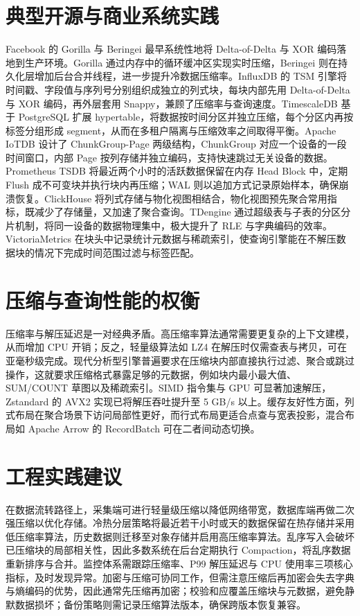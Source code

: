 \chapter{典型开源与商业系统实践}
Facebook 的 Gorilla 与 Beringei 最早系统性地将 Delta-of-Delta 与 XOR 编码落地到生产环境。Gorilla 通过内存中的循环缓冲区实现实时压缩，Beringei 则在持久化层增加后台合并线程，进一步提升冷数据压缩率。InfluxDB 的 TSM 引擎将时间戳、字段值与序列号分别组织成独立的列式块，每块内部先用 Delta-of-Delta 与 XOR 编码，再外层套用 Snappy，兼顾了压缩率与查询速度。TimescaleDB 基于 PostgreSQL 扩展 hypertable，将数据按时间分区并独立压缩，每个分区内再按标签分组形成 segment，从而在多租户隔离与压缩效率之间取得平衡。Apache IoTDB 设计了 ChunkGroup-Page 两级结构，ChunkGroup 对应一个设备的一段时间窗口，内部 Page 按列存储并独立编码，支持快速跳过无关设备的数据。Prometheus TSDB 将最近两个小时的活跃数据保留在内存 Head Block 中，定期 Flush 成不可变块并执行块内再压缩；WAL 则以追加方式记录原始样本，确保崩溃恢复。ClickHouse 将列式存储与物化视图相结合，物化视图预先聚合常用指标，既减少了存储量，又加速了聚合查询。TDengine 通过超级表与子表的分区分片机制，将同一设备的数据物理集中，极大提升了 RLE 与字典编码的效率。VictoriaMetrics 在块头中记录统计元数据与稀疏索引，使查询引擎能在不解压数据块的情况下完成时间范围过滤与标签匹配。\par
\chapter{压缩与查询性能的权衡}
压缩率与解压延迟是一对经典矛盾。高压缩率算法通常需要更复杂的上下文建模，从而增加 CPU 开销；反之，轻量级算法如 LZ4 在解压时仅需查表与拷贝，可在亚毫秒级完成。现代分析型引擎普遍要求在压缩块内部直接执行过滤、聚合或跳过操作，这就要求压缩格式暴露足够的元数据，例如块内最小最大值、SUM/COUNT 草图以及稀疏索引。SIMD 指令集与 GPU 可显著加速解压，Zstandard 的 AVX2 实现已将解压吞吐提升至 5 GB/s 以上。缓存友好性方面，列式布局在聚合场景下访问局部性更好，而行式布局更适合点查与宽表投影，混合布局如 Apache Arrow 的 RecordBatch 可在二者间动态切换。\par
\chapter{工程实践建议}
在数据流转路径上，采集端可进行轻量级压缩以降低网络带宽，数据库端再做二次强压缩以优化存储。冷热分层策略将最近若干小时或天的数据保留在热存储并采用低压缩率算法，历史数据则迁移至对象存储并启用高压缩率算法。乱序写入会破坏已压缩块的局部相关性，因此多数系统在后台定期执行 Compaction，将乱序数据重新排序与合并。监控体系需跟踪压缩率、P99 解压延迟与 CPU 使用率三项核心指标，及时发现异常。加密与压缩可协同工作，但需注意压缩后再加密会失去字典与熵编码的优势，因此通常先压缩再加密；校验和应覆盖压缩块与元数据，避免静默数据损坏；备份策略则需记录压缩算法版本，确保跨版本恢复兼容。\par
